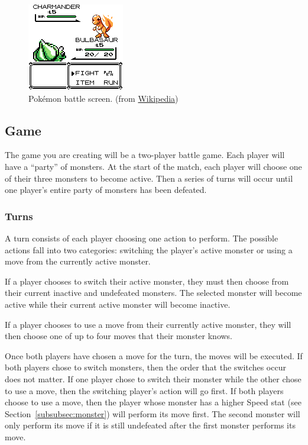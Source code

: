 \documentclass[11pt]{cselabheader}
\begin{document}
\begin{figure}[h]
  \centering
  \includegraphics{img/Bulbasaur_pokemon_red}
  \caption{Pok\'emon battle screen. (from
    \href{http://en.wikipedia.org/wiki/File:Bulbasaur_pokemon_red.png}{Wikipedia})}
  \label{poke}
\end{figure}

\subsection{Game}
The game you are creating will be a two-player battle game. Each player will
have a ``party'' of monsters. At the start of the match, each player will choose
one of their three monsters to become active. Then a series of turns will occur
until one player's entire party of monsters has been defeated.

\subsubsection{Turns}
\label{subsubsec:turn}
A turn consists of each player choosing one action to perform. The possible
actions fall into two categories: switching the player's active monster or using
a move from the currently active monster.

If a player chooses to switch their active monster, they must then choose from
their current inactive and undefeated monsters. The selected monster will become
active while their current active monster will become inactive.

If a player chooses to use a move from their currently active monster, they will
then choose one of up to four moves that their monster knows.

Once both players have chosen a move for the turn, the moves will be executed.
If both players chose to switch monsters, then the order that the switches occur
does not matter. If one player chose to switch their monster while the other chose
to use a move, then the switching player's action will go first. If both players
choose to use a move, then the player whose monster has a higher Speed stat (see
Section~\ref{subsubsec:monster}) will perform its move first. The second monster
will only perform its move if it is still undefeated after the first monster
performs its move.
\end{document}
